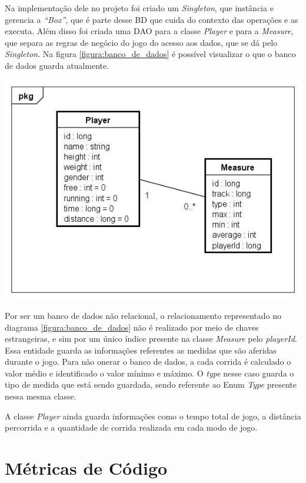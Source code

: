 Na implementação dele no projeto foi criado um \textit{Singleton}, que instância e gerencia a \textit{“Box”}, que é parte desse BD que cuida do contexto das operações e as executa. Além disso foi criada uma DAO para a classe \textit{Player} e para a \textit{Measure}, que separa as regras de negócio do jogo do acesso aos dados, que se dá pelo \textit{Singleton}. Na figura \ref{figura:banco_de_dados} é possível visualizar o que o banco de dados guarda atualmente.

\begin{center}
	\includegraphics[scale=0.6]{figuras/banco_de_dados}
	\label{figura:banco_de_dados}
\end{center}

Por ser um banco de dados não relacional, o relacionamento representado no diagrama \ref{figura:banco_de_dados} não é realizado por meio de chaves estrangeiras, e sim por um único índice presente na classe \textit{Measure} pelo \textit{playerId}. Essa entidade guarda as informações referentes as medidas que são aferidas durante o jogo. Para não onerar o banco de dados, a cada corrida é calculado o valor médio e identificado o valor mínimo e máximo. O \textit{type} nesse caso guarda o tipo de medida que está sendo guardada, sendo referente ao Enum \textit{Type} presente nessa mesma classe.

A classe \textit{Player} ainda guarda informações como o tempo total de jogo, a distância percorrida e a quantidade de corrida realizada em cada modo de jogo.

\section{Métricas de Código}


